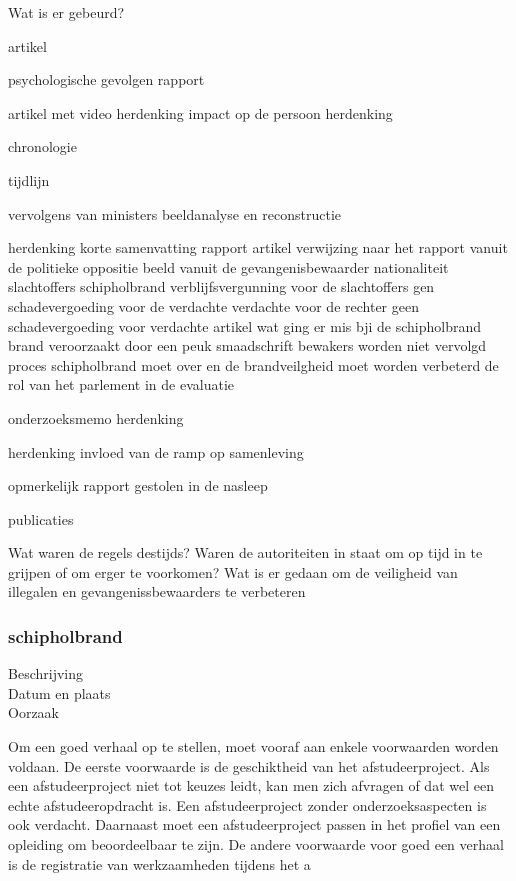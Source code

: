 Wat is er gebeurd?

\cite{schipholbrand27102005video}
artikel

\cite{schipholbrand27102005video}
psychologische gevolgen
rapport

\cite{onderzoeksraad2610schipholoost}
artikel met video
herdenking
impact op de persoon
herdenking

\cite{schipholbrandvideoargos}
chronologie

\cite{nunl30052023feitenoverzicht}
tijdlijn


vervolgens van ministers
beeldanalyse en reconstructie

\cite{}
herdenking
korte samenvatting
rapport
artikel
verwijzing naar het rapport vanuit de politieke oppositie
beeld vanuit de gevangenisbewaarder
nationaliteit slachtoffers schipholbrand
verblijfsvergunning voor de slachtoffers
gen schadevergoeding voor de verdachte
verdachte voor de rechter
geen schadevergoeding voor verdachte
artikel wat ging er mis bji de schipholbrand
brand veroorzaakt door een peuk
smaadschrift
bewakers worden niet vervolgd
proces schipholbrand moet over en de brandveilgheid moet worden verbeterd
de rol van het parlement in de evaluatie

\cite{parlementairemonitorschipholbrand}
onderzoeksmemo
herdenking

herdenking
invloed van de ramp op samenleving

\cite{videonpoNOVA13112008}
opmerkelijk rapport gestolen in de nasleep

\cite{rizoomes01052014schipholbrand}


publicaties


\cite{heuvelkroesschipholbrandcamerabeelden}
Wat waren de regels destijds?
Waren de autoriteiten in staat om op tijd in te grijpen of om erger te voorkomen?
Wat is er gedaan om de veiligheid van illegalen en gevangenissbewaarders te verbeteren



\subsubsection{schipholbrand}

\begin{description}
\item[Beschrijving]
\item[Datum en plaats] 
\item[Oorzaak]
\end{description}
Om een goed verhaal op te stellen, moet vooraf aan enkele voorwaarden
worden voldaan. De eerste voorwaarde is de geschiktheid van het
afstudeerproject. Als een afstudeerproject niet tot keuzes leidt, kan
men zich afvragen of dat wel een echte afstudeeropdracht is. Een
afstudeerproject zonder onderzoeksaspecten is ook verdacht. Daarnaast
moet een afstudeerproject passen in het profiel van een opleiding om
beoordeelbaar te zijn. De andere voorwaarde voor goed een verhaal is
de registratie van werkzaamheden tijdens het a


